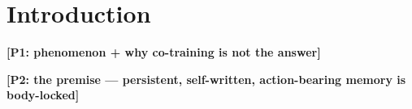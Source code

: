 \documentclass[letterpaper, 10 pt, conference]{ieeeconf}
\newcommand{\todo}[1]{\textbf{[#1]}}
\begin{document}
\section{Introduction}
\label{sec:intro}
%

\todo{P1: phenomenon + why co-training is not the answer}

\todo{P2: the premise --- persistent, self-written, action-bearing memory is body-locked}
\end{document}
